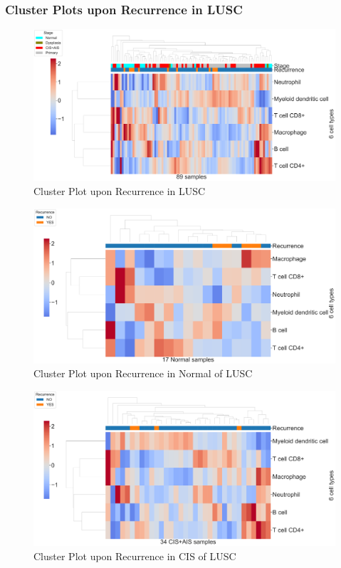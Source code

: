 \documentclass{beamer}
\begin{document}
    \begin{frame}[allowframebreaks]
        \frametitle{Cluster Plots upon Recurrence in LUSC}

        \begin{figure}
            \includegraphics[width=0.9 \linewidth]{figures/TIMER/Clustermap/STAR.FPKM.SQC.Recurrence/TIMER-All.pdf}
            \caption{Cluster Plot upon Recurrence in LUSC}
        \end{figure}

        \begin{figure}
            \includegraphics[width=0.9 \linewidth]{figures/TIMER/Clustermap/STAR.FPKM.SQC.Recurrence/TIMER-Normal.pdf}
            \caption{Cluster Plot upon Recurrence in Normal of LUSC}
        \end{figure}

        \begin{figure}
            \includegraphics[width=0.9 \linewidth]{figures/TIMER/Clustermap/STAR.FPKM.SQC.Recurrence/TIMER-CIS+AIS.pdf}
            \caption{Cluster Plot upon Recurrence in CIS of LUSC}
        \end{figure}


\end{frame}
\end{document}
